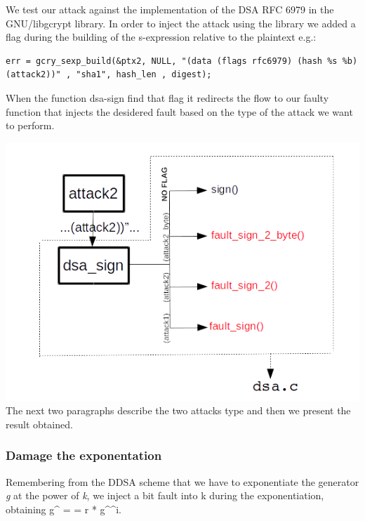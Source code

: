\documentclass[11pt,english]{article}
\begin{document}
We test our attack against the implementation of the DSA RFC 6979 in the GNU/libgcrypt\cite{lib} library. 
In order to inject the attack using the library we added a flag during the building of the s-expression relative to the plaintext e.g.:

\begin{lstlisting}
err = gcry_sexp_build(&ptx2, NULL, "(data (flags rfc6979) (hash %s %b) (attack2))" , "sha1", hash_len , digest);
\end{lstlisting}

When the function dsa-sign find that flag it redirects the flow to our faulty function that injects the desidered fault based on the type of the attack we want to perform.

\includegraphics[width=1.0\textwidth]{img/img_3.png} \\

The next two paragraphs describe the two attacks type and then we present the result obtained.

\subsubsection{Damage the exponentation}

Remembering from the DDSA scheme that we have to exponentiate the generator \textit{g} at the power of \textit{k}, we inject a bit fault into k during the exponentiation, obtaining g^{} =  = r * g^{^{i}}.
\end{document}
